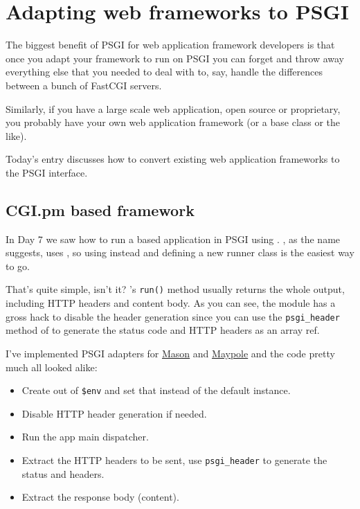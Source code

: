 \chapter{Adapting web frameworks to PSGI}\label{day-8-adapting-web-frameworks-to-psgi}

The biggest benefit of PSGI for web application framework developers is
that once you adapt your framework to run on PSGI you can forget and
throw away everything else that you needed to deal with to, say, handle
the differences between a bunch of FastCGI servers.

Similarly, if you have a large scale web application, open source or
proprietary, you probably have your own web application framework (or a
base class or the like).

Today's entry discusses how to convert existing web application
frameworks to the PSGI interface.

\section{CGI.pm based framework}\label{cgi.pm-based-framework}

In Day 7 we saw how to run a  based application in PSGI
using . , as the name suggests,
uses , so using  instead and defining a new runner class
is the easiest way to go.


That's quite simple, isn't it? 's \lstinline!run()!
method usually returns the whole output, including HTTP headers and
content body. As you can see, the module has a gross hack to disable the
header generation since you can use the \lstinline!psgi_header! method
of  to generate the status code and HTTP headers as an array
ref.

I've implemented PSGI adapters for
\href{http://search.cpan.org/perldoc?HTML::Mason}{Mason} and
\href{http://search.cpan.org/perldoc?Maypole}{Maypole} and the code
pretty much all looked alike:

\begin{itemize}
\itemsep1pt\parskip0pt
\item
  Create  out of \lstinline!$env! and set that instead of the
  default  instance.
\item
  Disable HTTP header generation if needed.
\item
  Run the app main dispatcher.
\item
  Extract the HTTP headers to be sent, use \lstinline!psgi_header! to
  generate the status and headers.
\item
  Extract the response body (content).
\end{itemize}

